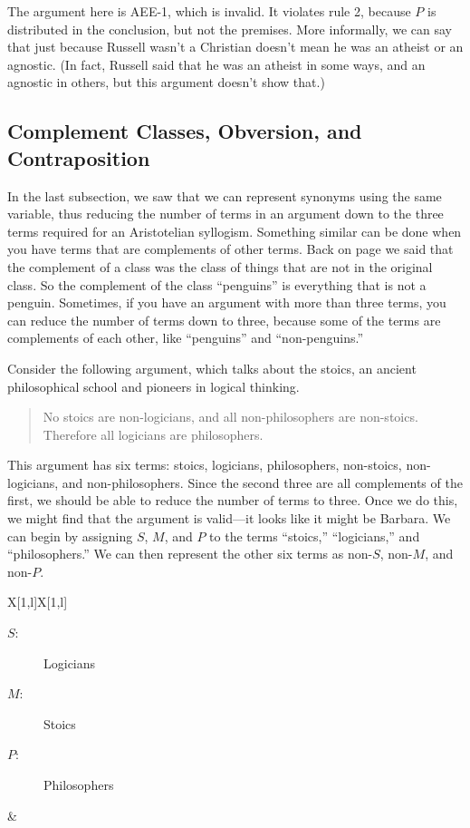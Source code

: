 The argument here is AEE-1, which is invalid. It violates rule 2, because $P$ is distributed in the conclusion, but not the premises. More informally, we can say that just because Russell wasn't a Christian doesn't mean he was an atheist or an agnostic. (In fact, Russell said that he was an atheist in some ways, and an agnostic in others, but this argument doesn't show that.)

\subsection{Complement Classes, Obversion, and Contraposition}

In the last subsection, we saw that we can represent synonyms using the same variable, thus reducing the number of terms in an argument down to the three terms required for an Aristotelian syllogism. Something similar can be done when you have terms that are complements of other terms. Back on page \pageref{def:Complement} we said that the complement of a class was the class of things that are not in the original class. So the complement of the class ``penguins'' is everything that is not a penguin. Sometimes, if you have an argument with more than three terms, you can reduce the number of terms down to three, because some of the terms are complements of each other, like ``penguins'' and ``non-penguins.''

Consider the following argument, which talks about the stoics, an ancient philosophical school and pioneers in logical thinking.

\begin{quotation}
No stoics are non-logicians, and all non-philosophers are non-stoics. Therefore all logicians are philosophers.
\end{quotation}

This argument has six terms: stoics, logicians, philosophers, non-stoics, non-logicians, and non-philosophers. Since the second three are all complements of the first, we should be able to reduce the number of terms to three. Once we do this, we might find that the argument is valid---it looks like it might be Barbara. We can begin by assigning $S$, $M$, and $P$ to the terms ``stoics,'' ``logicians,'' and ``philosophers.'' We can then represent the other six terms as non-$S$, non-$M$, and non-$P$.


\begin{tabu}{{X[1,l]X[1,l]}}

\begin{description}
\item[$S$:] Logicians
\item[$M$:] Stoics
\item[$P$:] Philosophers
\end{description}

&

\begin{kormanize}
\end{kormanize}

\end{tabu}

